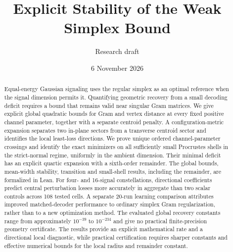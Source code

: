 \documentclass[11pt]{article}
\title{Explicit Stability of the Weak Simplex Bound}
\author{Research draft}
\date{6 November 2026}
\theoremstyle{remark}\newtheorem{remark}[theorem]{Remark}
\begin{document}
\maketitle
\begin{abstract}
Equal-energy Gaussian signaling uses the regular simplex as an optimal reference
when the signal dimension permits it. Quantifying geometric recovery from a
small decoding deficit requires a bound that remains valid near singular
Gram matrices. We give explicit global quadratic bounds for Gram and vertex
distance at every fixed positive channel parameter, together with a separate
centroid penalty. A configuration-metric expansion separates two in-plane
sectors from a transverse centroid sector and identifies the local least-loss
directions. We prove unique ordered channel-parameter crossings and identify
the exact minimizers on all sufficiently small Procrustes shells in the
strict-normal regime, uniformly in the ambient dimension. Their minimal
deficit has an explicit quartic expansion with a sixth-order remainder.
The global bounds, mean-width stability, transition and small-shell
results, including the remainder, are formalized in Lean. For four- and 16-signal constellations, directional coefficients
predict central perturbation losses more accurately in aggregate than two
scalar controls across 108 tested cells. A separate 20-run learning comparison
attributes improved matched-decoder performance to ordinary simplex Gram
regularization, rather than to a new optimization method. The evaluated global
recovery constants range from approximately $10^{-39}$ to $10^{-234}$ and
give no practical finite-precision geometry certificate. The results provide
an explicit mathematical rate and a directional local diagnostic, while
practical certification requires sharper constants and effective numerical
bounds for the local radius and remainder constant.
\end{abstract}
\end{document}
